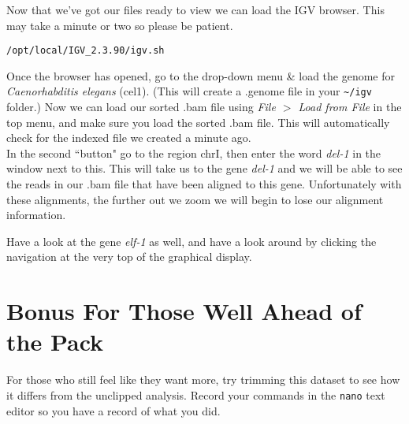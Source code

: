 \begin{steps}
Now that we've got our files ready to view we can load the IGV browser.
This may take a minute or two so please be patient.

\begin{lstlisting}
/opt/local/IGV_2.3.90/igv.sh
\end{lstlisting}
\end{steps}

\begin{steps}
Once the browser has opened, go to the drop-down menu \& load the genome for \textit{Caenorhabditis elegans} (cel1).
(This will create a .genome file in your \texttt{\~{}/igv} folder.)
Now we can load our sorted .bam file using  \textit{File $>$ Load from File} in the top menu, and make sure you load the sorted .bam file.
This will automatically check for the indexed file we created a minute ago. \\

In the second ``button" go to the region chrI, then enter the word \textit{del-1} in the window next to this.
This will take us to the gene \textit{del-1} and we will be able to see the reads in our .bam file that have been aligned to this gene.
Unfortunately with these alignments, the further out we zoom we will begin to lose our alignment information.

Have a look at the gene \textit{elf-1} as well, and have a look around by clicking the navigation at the very top of the graphical display.
\end{steps}

\section{Bonus For Those Well Ahead of the Pack}
\begin{advanced}
For those who still feel like they want more, try trimming this dataset to see how it differs from the unclipped analysis.
Record your commands in the \texttt{nano} text editor so you have a record of what you did.
\end{advanced}
